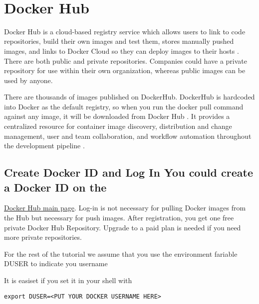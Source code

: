 \MDNAME\

\section{Docker Hub}

\label{s:dockerhub}

Docker Hub is a cloud-based registry service which allows users to link
to code repositories, build their own images and test them, stores
manually pushed images, and links to Docker Cloud so they can deploy
images to their hosts \cite{hid-sp18-405-tutorial-dockerhub-overview}.
There are both public and private repositories. Companies could have a
private repository for use within their own organization, whereas public
images can be used by anyone.

There are thousands of images published on DockerHub. DockerHub is
hardcoded into Docker as the default registry, so when you run the
docker pull command against any image, it will be downloaded from Docker
Hub \cite{hid-sp18-405-tutorial-dockerhub-blog-use}. It provides a
centralized resource for container image discovery, distribution and
change management, user and team collaboration, and workflow automation
throughout the development pipeline
\cite{hid-sp18-405-tutorial-dockerhub-overview}.

\subsection{Create Docker ID and Log In You could create a Docker ID on the}

\href{https://hub.docker.com/}{Docker Hub main page}. Log-in is not
necessary for pulling Docker images from the Hub but necessary for push
images. After registration, you get one free private Docker Hub
Repository. Upgrade to a paid plan is needed if you need more private
repositories.

For the rest of the tutorial we assume that you use the environment
fariable DUSER to indicate you username

It is easiset if you set it in your shell with

\begin{lstlisting}
export DUSER=<PUT YOUR DOCKER USERNAME HERE> 
\end{lstlisting}

